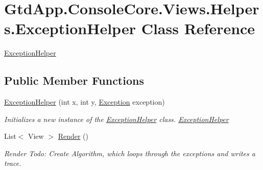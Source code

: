 \hypertarget{class_gtd_app_1_1_console_core_1_1_views_1_1_helpers_1_1_exception_helper}{}\section{Gtd\+App.\+Console\+Core.\+Views.\+Helpers.\+Exception\+Helper Class Reference}
\label{class_gtd_app_1_1_console_core_1_1_views_1_1_helpers_1_1_exception_helper}


\mbox{\hyperlink{class_gtd_app_1_1_console_core_1_1_views_1_1_helpers_1_1_exception_helper}{Exception\+Helper}}  


\subsection*{Public Member Functions}
\begin{DoxyCompactItemize}
\item 
\mbox{\hyperlink{class_gtd_app_1_1_console_core_1_1_views_1_1_helpers_1_1_exception_helper_aed029cd3117a78921a11aea36d2cd586}{Exception\+Helper}} (int x, int y, \mbox{\hyperlink{class_gtd_app_1_1_console_core_1_1_views_1_1_helpers_1_1_exception_helper_a29e79c9a6815bd3e00873a913f5337e6}{Exception}} exception)
\begin{DoxyCompactList}\small\item\em Initializes a new instance of the \mbox{\hyperlink{class_gtd_app_1_1_console_core_1_1_views_1_1_helpers_1_1_exception_helper}{Exception\+Helper}} class. \mbox{\hyperlink{class_gtd_app_1_1_console_core_1_1_views_1_1_helpers_1_1_exception_helper}{Exception\+Helper}} \end{DoxyCompactList}\item 
List$<$ View $>$ \mbox{\hyperlink{class_gtd_app_1_1_console_core_1_1_views_1_1_helpers_1_1_exception_helper_a050c87e58c1d43fd47ca2ebd37bedbec}{Render}} ()
\begin{DoxyCompactList}\small\item\em Render Todo\+: Create Algorithm, which loops through the exceptions and writes a trace. \end{DoxyCompactList}\end{DoxyCompactItemize}
